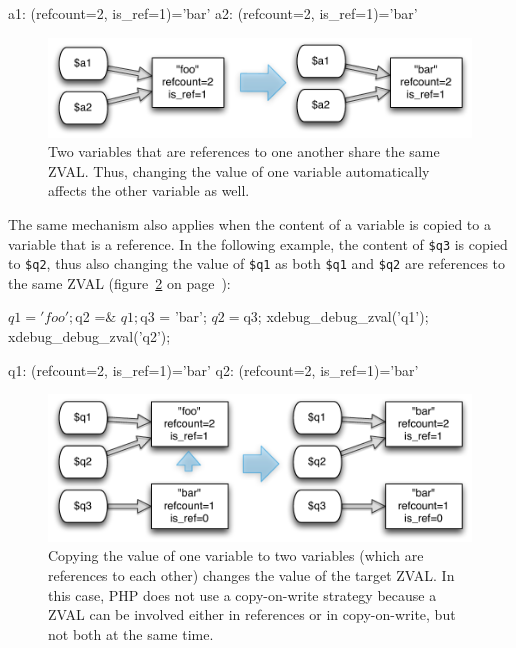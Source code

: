 \begin{textcode}
a1: (refcount=2, is_ref=1)='bar'
a2: (refcount=2, is_ref=1)='bar'
\end{textcode}

\begin{figure}[htb]
  \begin{center}
    \includegraphics[scale=0.8]{images/a1_a2}
    \caption{Two variables that are references to one another share the same ZVAL. Thus, changing the value of one variable automatically affects the other variable as well.}
    \label{fig:simple-reference}
  \end{center}
\end{figure}


The same mechanism also applies when the content of a variable is copied to a variable that is a reference. In the following example, the content of \texttt{\$q3} is copied to \texttt{\$q2}, thus also changing the value of \texttt{\$q1} as both \texttt{\$q1} and \texttt{\$q2} are references to the same ZVAL (figure~\ref{fig:copying-value-to-reference} on page~\pageref{fig:copying-value-to-reference}):

\begin{phpcode}
$q1 = 'foo';
$q2 =& $q1;

$q3 = 'bar';
$q2 = $q3;
xdebug_debug_zval('q1');
xdebug_debug_zval('q2');
\end{phpcode}

\begin{textcode}
q1: (refcount=2, is_ref=1)='bar'
q2: (refcount=2, is_ref=1)='bar'
\end{textcode}

\begin{figure}[htb]
  \begin{center}
    \includegraphics[scale=0.8]{images/q1_q2_q3}
    \caption{Copying the value of one variable to two variables (which are references to each other) changes the value of the target ZVAL. In this case, PHP does not use a copy-on-write strategy because a ZVAL can be involved either in references or in copy-on-write, but not both at the same time.}
    \label{fig:copying-value-to-reference}
  \end{center}
\end{figure}



